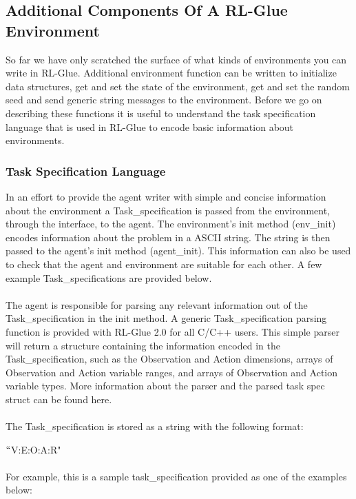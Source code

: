 \documentclass[11pt]{article}
\begin{document}
\subsection{Additional Components Of A RL-Glue Environment}
\label{envp2}

So far we have only scratched the surface of what kinds of environments you can write in RL-Glue. Additional environment function can be written to initialize data structures, get and set the state of the environment, get and set the random seed and send generic string messages to the environment. Before we go on describing these functions it is useful to understand the task specification language that is used in RL-Glue to encode basic information about environments. 

\subsubsection{Task Specification Language}
\label{task}
In an effort to provide the agent writer with simple and concise information about the environment a Task\_specification is passed from the environment, through the interface, to the agent. The environment's init method (env\_init) encodes information about the problem in a ASCII string. The string is then passed to the agent's init method (agent\_init).  This information can also be used to check that the agent and environment are suitable for each other. A few example Task\_specifications are provided below.
\\\\
The agent is responsible for parsing any relevant information out of the Task\_specification in the init method. A generic Task\_specification parsing function is provided with RL-Glue 2.0 for all C/C++ users. This simple parser will return a structure containing the information encoded in the Task\_specification, such as the Observation and Action dimensions, arrays of Observation and Action variable ranges, and arrays of Observation and Action variable types. More information about the parser and the parsed task spec struct can be found here.
\\\\
The Task\_specification is stored as a string with the following format:

\hspace{30 pt} $``$V:E:O:A:R"\\\\
For example, this is a sample task\_specification provided as one of the examples below:
\end{document}
